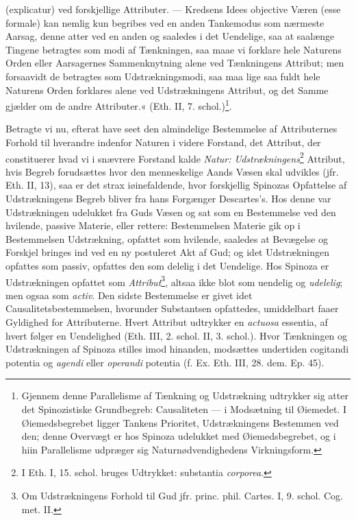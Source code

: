 \documentclass[12pt,a4paper]{book}
\newcommand{\opage}[1]{\marginnote{\footnotesize\textit{[#1]}}}
\begin{document}
(explicatur) ved forskjellige Attributer. --- Kredsens Idees
objective Væren (esse formale) kan nemlig kun begribes ved en
anden Tankemodus som nærmeste Aarsag, denne atter ved en anden og
saaledes i det Uendelige, saa at saalænge Tingene betragtes som
modi af Tænkningen, saa maae vi forklare hele Naturens Orden
eller Aarsagernes Sammenknytning alene ved Tænkningens Attribut;
men forsaavidt de betragtes som Udstrækningsmodi, saa maa lige
saa fuldt hele Naturens Orden forklares alene ved Udstrækningens
\opage{74} \setcounter{footnote}{0}%
Attribut, og det Samme gjælder om de andre Attributer.« (Eth. II,
7. schol.)\footnote{Gjennem denne Parallelisme af Tænkning og
Udstrækning udtrykker sig atter det Spinozistiske Grundbegreb:
Causaliteten --- i Modsætning til Øiemedet. I Øiemedsbegrebet
ligger Tankens Prioritet, Udstrækningens Bestemmen ved den; denne
Overvægt er hos Spinoza udelukket med Øiemedsbegrebet, og i hiin
Parallelisme udpræger sig Naturnødvendighedens Virkningsform.}.

Betragte vi nu, efterat have seet den almindelige Bestemmelse af
Attributernes Forhold til hverandre indenfor Naturen i videre
Forstand, det Attribut, der constituerer hvad vi i snævrere
Forstand kalde \emph{Natur: Udstrækningens}\footnote{I Eth. I, 15.
schol. bruges Udtrykket: substantia \emph{corporea}.} Attribut, hvis
Begreb forudsættes hvor den menneskelige Aands Væsen skal
udvikles (jfr. Eth. II, 13), saa er det strax iøinefaldende, hvor
forskjellig Spinozas Opfattelse af Udstrækningens Begreb bliver
fra hans Forgænger Descartes's. Hos denne var Udstrækningen
udelukket fra Guds Væsen og sat som en Bestemmelse ved den
hvilende, passive Materie, eller rettere: Bestemmelsen Materie
gik op i Bestemmelsen Udstrækning, opfattet som hvilende,
saaledes at Bevægelse og Forskjel bringes ind ved en ny postuleret
Akt af Gud; og idet Udstrækningen opfattes som passiv, opfattes
den som delelig i det Uendelige. Hos Spinoza er Udstrækningen
opfattet som \emph{Attribut}\footnote{Om Udstrækningens Forhold til Gud
jfr. princ. phil. Cartes. I, 9. schol. Cog. met. II.}, altsaa
ikke blot som uendelig og \emph{udelelig}; men ogsaa som \emph{activ}. Den
sidste Bestemmelse er givet idet Causalitetsbestemmelsen,
hvorunder Substantsen opfattedes, umiddelbart faaer Gyldighed for
Attributerne. Hvert Attribut udtrykker en \emph{actuosa} essentia, af
hvert følger en Uendelighed (Eth. III, 2. schol. II, 3. schol.).
Hvor Tænkningen og Udstrækningen af Spinoza stilles imod
hinanden, modsættes undertiden cogitandi potentia og \emph{agendi} eller
\emph{operandi} potentia (f. Ex. Eth. III, 28. dem. Ep. 45).
\end{document}
